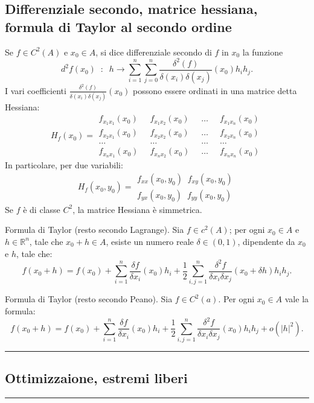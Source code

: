 \subsection*{Differenziale secondo, matrice hessiana, formula di Taylor al secondo ordine}
Se $f \in C^2(A)$ e $x_0 \in A$, si dice differenziale secondo di $f$ in $x_0$ la funzione
\[
    d^2f(x_0) \;\;:\;\; h \rightarrow \sum_{i=1}^{n}\sum_{j=0}^{n}\frac{\delta^2(f)}{\delta(x_i) \delta(x_j)}(x_0)h_ih_j.
\]
I vari coefficienti $\frac{\delta^2(f)}{\delta(x_i) \delta(x_j)}(x_0)$ possono essere ordinati in una matrice detta Hessiana:
\[
    H_f(x_0) =\begin{matrix}
        f_{x_1x_1}(x_0) \;\; &f_{x_1x_2}(x_0) \;\; &\dots \;\; &f_{x_1x_n}(x_0)\\
        f_{x_2x_1}(x_0) \;\; &f_{x_2x_2}(x_0) \;\; &\dots \;\; &f_{x_2x_n}(x_0)\\
        \dots \;\; &\dots \;\; &\dots \;\; &\dots\\
        f_{x_nx_1}(x_0) \;\; &f_{x_nx_2}(x_0) \;\; &\dots \;\; &f_{x_nx_n}(x_0)
    \end{matrix}
\]  
In particolare, per due variabili:
\[
    H_f(x_0, y_0) = \begin{matrix}
        f_{xx}(x_0, y_0) \;\; f_{xy}(x_0, y_0)\\
        f_{yx}(x_0, y_0) \;\; f_{yy}(x_0, y_0)
    \end{matrix}
\]
Se $f$ è di classe $C^2$, la matrice Hessiana è simmetrica.\newline

Formula di Taylor (resto secondo Lagrange). Sia $f \in c^2(A)$; per ogni $x_0 \in A$ e $h \in \mathbb{R}^n$, tale che $x_0 + h \in A$, esiste un numero reale $\delta \in (0,1)$, dipendente da $x_0$ e $h$, tale che:
\[
    f(x_0 + h) = f(x_0) +\sum_{i=1}^{n}\frac{\delta f}{\delta x_i}(x_0)h_i + \frac{1}{2}\sum_{i,j=1}^{n}\frac{\delta^2f}{\delta x_i \delta x_j}(x_0 + \delta h) h_i h_j.
\]\newline

Formula di Taylor (resto secondo Peano). Sia $f \in C^2(a)$. Per ogni $x_0 \in A$ vale la formula:
\[
    f(x_0 + h) = f(x_0) +\sum_{i=1}^{n}\frac{\delta f}{\delta x_i}(x_0)h_i + \frac{1}{2}\sum_{i,j=1}^{n}\frac{\delta^2f}{\delta x_i \delta x_j}(x_0) h_i h_j +o(|h|^2).
\]
\rule{\textwidth}{2pt}
\subsection*{Ottimizzaione, estremi liberi}
\rule{\textwidth}{0.4pt}
